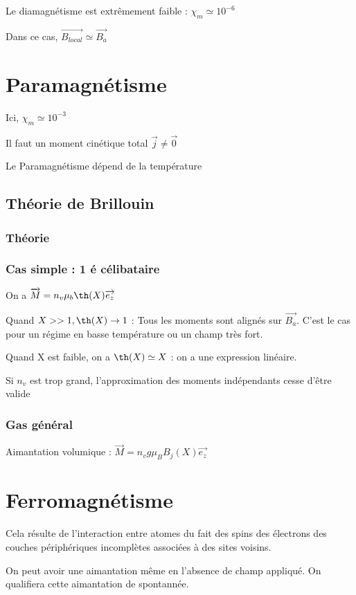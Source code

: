 \documentclass[french]{yLectureNote}
\renewcommand{\vec}{\overrightarrow}
\begin{document}
Le diamagnétisme est extrêmement faible : $\chi_m \simeq 10^{-6}$

Dans ce cas, $\vec{B_{local}}\simeq \vec{B_a}$
\section{Paramagnétisme}
Ici, $\chi_m \simeq 10^{-3}$


Il faut un moment cinétique total $\vec{j}\neq \vec{0}$

Le Paramagnétisme dépend de la température
\subsection{Théorie de Brillouin}
\subsubsection{Théorie}
\subsubsection{Cas simple : 1 é célibataire}
On a $\vec{M} = n_v \mu_b \th(X)\vec{e_z}$

Quand $X>> 1, \th(X)\to 1$ : Tous les moments sont alignés sur $\vec{B_a}$. C'est le cas pour un régime en basse température ou un champ très fort.

Quand X est faible, on a $\th(X) \simeq X$ : on a une expression linéaire.

Si $n_v$ est trop grand, l'approximation des moments indépendants cesse d'être valide
\subsubsection{Gas général}
\begin{definition}
    Aimantation volumique : $\vec{M} = n_v g\mu_B B_j(X)\vec{e_z}$

\end{definition}
\section{Ferromagnétisme}
\begin{definition}
    Cela résulte de l'interaction entre atomes du fait des spins des électrons des couches périphériques incomplètes associées à des
sites voisins.

On peut avoir une aimantation même en l'absence de champ appliqué. On qualifiera cette aimantation de spontannée.
\end{definition}
\end{document}
